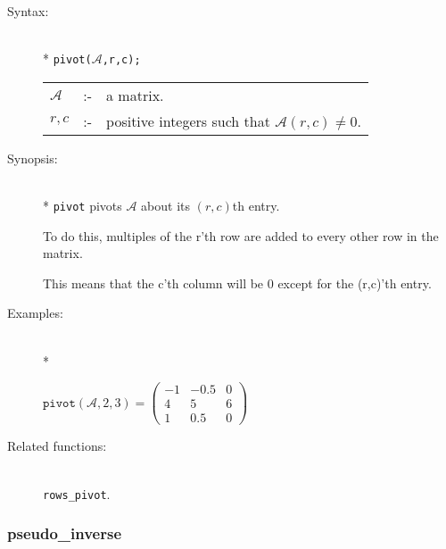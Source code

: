 \begin{description}
\item[Syntax:]\mbox{}\\*
\texttt{pivot($\mathcal{A}$,r,c);}\\[2mm]
\begin{tabular}{l l l} 
$\mathcal{A}$ &:-& a matrix. \\
$r,c$        &:-& positive integers such that $\mathcal{A}(r,c) \neq 0$.
\end{tabular}

\item[Synopsis:]\mbox{}\\*
\texttt{pivot} pivots $\mathcal{A}$ about its $(r,c)$th entry.
 
To do this, multiples of the r'th row are added to every
     other row in the matrix. 

This means that the c'th column
                will be 0 except for the (r,c)'th entry. 

\item[Examples:]\mbox{}\\*
\begin{flushleft}  
\begin{math}  
\texttt{pivot}(\mathcal{A},2,3) = 
        \begin{pmatrix} -1 & -0.5 & 0 \\ 4 & 5 & 6 \\ 1 & 0.5 & 0 \end{pmatrix}
\end{math}  
\end{flushleft}

\item[Related functions:]\mbox{}\\
\texttt{rows\_pivot}.
\end{description}


\subsubsection{pseudo\_inverse}
\label{linalg:pseudo_inverse}

